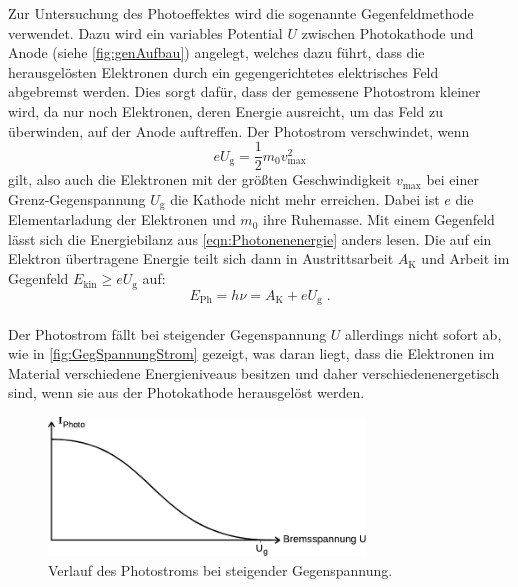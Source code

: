     Zur Untersuchung des Photoeffektes wird die sogenannte Gegenfeldmethode verwendet.
    Dazu wird ein variables Potential $U$ zwischen Photokathode und Anode (siehe \autoref{fig:genAufbau}) angelegt,
    welches dazu führt,
    dass die herausgelösten Elektronen durch ein gegengerichtetes elektrisches Feld abgebremst werden.
    Dies sorgt dafür,
    dass der gemessene Photostrom kleiner wird,
    da nur noch Elektronen,
    deren Energie ausreicht, um das Feld zu überwinden,
    auf der Anode auftreffen.
    Der Photostrom verschwindet,
    wenn
    \begin{equation}
        e U_\text{g} = \frac{1}{2} m_0 v_\text{max}^2
    \end{equation}
    gilt,
    also auch die Elektronen mit der größten Geschwindigkeit $v_\text{max}$ bei einer Grenz-Gegenspannung $U_\text{g}$
    die Kathode nicht mehr erreichen.
    Dabei ist  $e$ die Elementarladung der Elektronen und $m_0$ ihre Ruhemasse.
    Mit einem Gegenfeld lässt sich die Energiebilanz aus \autoref{eqn:Photonenenergie} anders lesen.
    Die auf ein Elektron übertragene Energie teilt sich dann
    in Austrittsarbeit $A_\text{K}$ und Arbeit im Gegenfeld $E_\text{kin} \geq e U_\text{g}$ auf:
    \begin{equation}
        E_\text{Ph} = h \nu = A_\text{K} + e U_\text{g} \; .
    \end{equation}
    \ \\
    Der Photostrom fällt bei steigender Gegenspannung $U$ allerdings nicht sofort ab, wie in \autoref{fig:GegSpannungStrom} gezeigt,
    was daran liegt,
    dass die Elektronen im Material verschiedene Energieniveaus besitzen und daher verschiedenenergetisch sind,
    wenn sie aus der Photokathode herausgelöst werden.

    \begin{figure}
        \centering
        \includegraphics[width=0.75\textwidth]{content/img/Abb_5.pdf}
        \caption{Verlauf des Photostroms bei steigender Gegenspannung. \cite{versuchsanleitung}}
        \label{fig:GegSpannungStrom}
    \end{figure}

